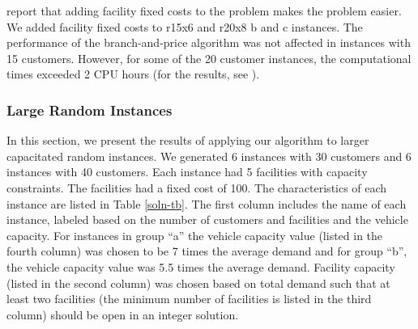 \citet{Laporte86} report that adding facility fixed costs to the
problem makes the problem easier. We added facility fixed costs to
r15x6 and r20x8 b and c instances. The performance of the
branch-and-price algorithm was not affected in instances with 15
customers. However, for some of the 20 customer instances, the
computational times exceeded 2 CPU hours (for the results, see
\citet{Akca2}).


\subsubsection{Large Random Instances}
In this section, we present the results of applying our algorithm to
larger capacitated random instances. We generated 6 instances with 30
customers and 6 instances with 40 customers. Each instance had 5
facilities with capacity constraints. The facilities had a fixed cost
of 100. The characteristics of each instance are listed in Table
\ref{soln-tb}. The first column includes the name of each instance,
labeled based on the number of customers and facilities and the
vehicle capacity. For instances in group ``a'' the vehicle capacity
value (listed in the fourth column) was chosen to be 7 times the
average demand and for group ``b'', the vehicle capacity value was 5.5
times the average demand. Facility capacity (listed in the second
column) was chosen based on total demand such that at least two
facilities (the minimum number of facilities is listed in the third
column) should be open in an integer solution.

